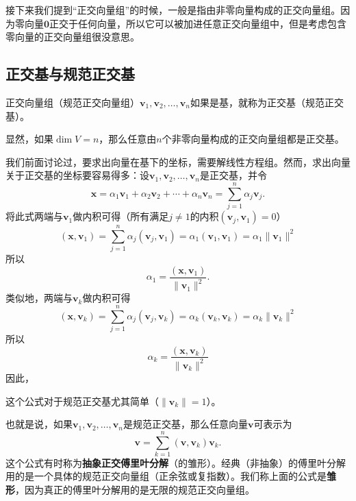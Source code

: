 \begin{remark*}
    接下来我们提到“正交向量组”的时候，一般是指由非零向量构成的正交向量组。因为零向量$\mathbf{0}$正交于任何向量，所以它可以被加进任意正交向量组中，但是考虑包含零向量的正交向量组很没意思。
\end{remark*}

\subsection{正交基与规范正交基}\label{subsec:orthogonal_orthonormal}

\begin{definition}
    正交向量组（规范正交向量组）$\mathbf{v}_{1},\mathbf{v}_{2},\ldots,\mathbf{v}_{n}$如果是基，就称为正交基（规范正交基）。
\end{definition}

显然，如果$\dim V=n$，那么任意由$n$个非零向量构成的正交向量组都是正交基。

我们前面讨论过，要求出向量在基下的坐标，需要解线性方程组。然而，求出向量关于正交基的坐标要容易得多：设$\mathbf{v}_{1},\mathbf{v}_{2},\ldots,\mathbf{v}_{n}$是正交基，并令\[\mathbf{x}=\alpha_1\mathbf{v}_1+\alpha_2\mathbf{v}_2+\cdots+\alpha_n\mathbf{v}_n=\sum_{j=1}^n\alpha_j\mathbf{v}_j.\]
将此式两端与$\mathbf{v}_1$做内积可得（所有满足$j\ne 1$的内积$(\mathbf{v}_j,\mathbf{v}_1)=0$）
\[(\mathbf{x},\mathbf{v}_1)=\sum_{j=1}^n\alpha_j(\mathbf{v}_j,\mathbf{v}_1)=\alpha_1(\mathbf{v}_1,\mathbf{v}_1)=\alpha_1\|\mathbf{v}_1\|^2\]
所以\[\alpha_1=\frac{(\mathbf{x},\mathbf{v}_1)}{\|\mathbf{v}_1\|^2}.\]
类似地，两端与$\mathbf{v}_k$做内积可得
\[(\mathbf{x},\mathbf{v}_k)=\sum_{j=1}^n\alpha_j(\mathbf{v}_j,\mathbf{v}_k)=\alpha_k(\mathbf{v}_k,\mathbf{v}_k)=\alpha_k\|\mathbf{v}_k\|^2\]
所以
\begin{equation}\label{coeff_orthogonal}
    \alpha_k=\frac{(\mathbf{x},\mathbf{v}_k)}{\|\mathbf{v}_k\|^2}
\end{equation}
因此，
\begin{center}
\end{center}
这个公式对于规范正交基尤其简单（$\|\mathbf{v}_k\|=1$）。

也就是说，如果$\mathbf{v}_{1},\mathbf{v}_{2},\ldots,\mathbf{v}_{n}$是规范正交基，那么任意向量$\mathbf{v}$可表示为
\begin{equation}\label{coeff_orthonormal}
    \mathbf{v}=\sum_{k=1}^n(\mathbf{v},\mathbf{v}_k)\mathbf{v}_k.
\end{equation}
这个公式有时称为\textbf{抽象正交傅里叶分解}（的雏形）。经典（非抽象）的傅里叶分解用的是一个具体的规范正交向量组（正余弦或复指数）。我们称上面的公式是\textbf{雏形}，因为真正的傅里叶分解用的是无限的规范正交向量组。

